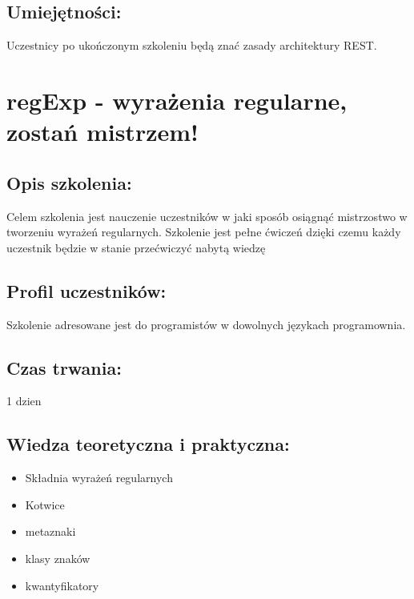 \documentclass{article}[10pt]
\begin{document}
	\subsection*{Umiejętności:}
\begin{adjustwidth}{2cm}{}
\justifying
	
Uczestnicy po ukończonym szkoleniu będą znać zasady architektury REST.
\end{adjustwidth}

\newpage


    
	\section{regExp - wyrażenia regularne, zostań mistrzem!}

	\subsection*{Opis szkolenia:}
	\begin{adjustwidth}{2cm}{}
\justifying
		
Celem szkolenia jest nauczenie uczestników w jaki sposób osiągnąć mistrzostwo w tworzeniu wyrażeń regularnych. Szkolenie jest pełne ćwiczeń dzięki czemu każdy uczestnik będzie w stanie przećwiczyć nabytą wiedzę
	\end{adjustwidth}
	\subsection*{Profil uczestników:}
\begin{adjustwidth}{2cm}{}
\justifying
	
Szkolenie adresowane jest do programistów w dowolnych językach programownia.
\end{adjustwidth}
	\subsection*{Czas trwania:}
\begin{adjustwidth}{2cm}{}
	1 dzien
\end{adjustwidth}

	\subsection*{Wiedza teoretyczna i praktyczna:}
\begin{adjustwidth}{1.5cm}{}
	\begin{itemize}
		\item Składnia wyrażeń regularnych
		\item Kotwice
		\item metaznaki
		\item klasy znaków
		\item kwantyfikatory
	\end{itemize}
\end{adjustwidth}
\end{document}

